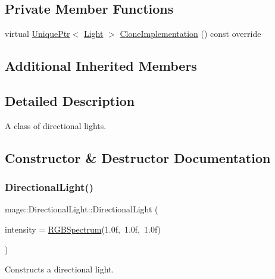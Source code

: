 \subsection*{Private Member Functions}
\begin{DoxyCompactItemize}
\item 
virtual \hyperlink{namespacemage_a8c307fbcc33bce9b7f2aa4c26c3b95cf}{Unique\+Ptr}$<$ \hyperlink{classmage_1_1_light}{Light} $>$ \hyperlink{classmage_1_1_directional_light_a122d3dcd7633a85ef8a85e7d768da36d}{Clone\+Implementation} () const override
\end{DoxyCompactItemize}
\subsection*{Additional Inherited Members}


\subsection{Detailed Description}
A class of directional lights. 

\subsection{Constructor \& Destructor Documentation}
\hypertarget{classmage_1_1_directional_light_a67df04219f61a8350045e5743b1de284}{}\label{classmage_1_1_directional_light_a67df04219f61a8350045e5743b1de284} 
\subsubsection{\texorpdfstring{Directional\+Light()}{DirectionalLight()}\hspace{0.1cm}{\footnotesize\ttfamily [1/3]}}
{\footnotesize\ttfamily mage\+::\+Directional\+Light\+::\+Directional\+Light (\begin{DoxyParamCaption}\item[{const \hyperlink{structmage_1_1_r_g_b_spectrum}{R\+G\+B\+Spectrum} \&}]{intensity = {\ttfamily \hyperlink{structmage_1_1_r_g_b_spectrum}{R\+G\+B\+Spectrum}(1.0f,~1.0f,~1.0f)} }\end{DoxyParamCaption})\hspace{0.3cm}{\ttfamily [explicit]}}

Constructs a directional light.


